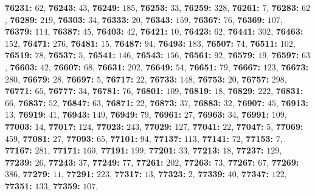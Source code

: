 \textsf{\bfseries 76231:} $62$, \textsf{\bfseries 76243:} $43$, \textsf{\bfseries 76249:} $185$, \textsf{\bfseries 76253:} $33$, \textsf{\bfseries 76259:} $328$, \textsf{\bfseries 76261:} $7$, \textsf{\bfseries 76283:} $62$, \textsf{\bfseries 76289:} $219$, \textsf{\bfseries 76303:} $34$, \textsf{\bfseries 76333:} $20$, \textsf{\bfseries 76343:} $159$, \textsf{\bfseries 76367:} $76$, \textsf{\bfseries 76369:} $107$, \textsf{\bfseries 76379:} $114$, \textsf{\bfseries 76387:} $45$, \textsf{\bfseries 76403:} $42$, \textsf{\bfseries 76421:} $10$, \textsf{\bfseries 76423:} $62$, \textsf{\bfseries 76441:} $302$, \textsf{\bfseries 76463:} $152$, \textsf{\bfseries 76471:} $276$, \textsf{\bfseries 76481:} $15$, \textsf{\bfseries 76487:} $94$, \textsf{\bfseries 76493:} $183$, \textsf{\bfseries 76507:} $74$, \textsf{\bfseries 76511:} $102$, \textsf{\bfseries 76519:} $78$, \textsf{\bfseries 76537:} $5$, \textsf{\bfseries 76541:} $146$, \textsf{\bfseries 76543:} $156$, \textsf{\bfseries 76561:} $92$, \textsf{\bfseries 76579:} $19$, \textsf{\bfseries 76597:} $63$, \textsf{\bfseries 76603:} $42$, \textsf{\bfseries 76607:} $68$, \textsf{\bfseries 76631:} $202$, \textsf{\bfseries 76649:} $54$, \textsf{\bfseries 76651:} $79$, \textsf{\bfseries 76667:} $123$, \textsf{\bfseries 76673:} $280$, \textsf{\bfseries 76679:} $28$, \textsf{\bfseries 76697:} $5$, \textsf{\bfseries 76717:} $22$, \textsf{\bfseries 76733:} $148$, \textsf{\bfseries 76753:} $20$, \textsf{\bfseries 76757:} $298$, \textsf{\bfseries 76771:} $65$, \textsf{\bfseries 76777:} $34$, \textsf{\bfseries 76781:} $76$, \textsf{\bfseries 76801:} $109$, \textsf{\bfseries 76819:} $18$, \textsf{\bfseries 76829:} $222$, \textsf{\bfseries 76831:} $66$, \textsf{\bfseries 76837:} $52$, \textsf{\bfseries 76847:} $63$, \textsf{\bfseries 76871:} $22$, \textsf{\bfseries 76873:} $37$, \textsf{\bfseries 76883:} $32$, \textsf{\bfseries 76907:} $45$, \textsf{\bfseries 76913:} $13$, \textsf{\bfseries 76919:} $41$, \textsf{\bfseries 76943:} $149$, \textsf{\bfseries 76949:} $79$, \textsf{\bfseries 76961:} $27$, \textsf{\bfseries 76963:} $34$, \textsf{\bfseries 76991:} $109$, \textsf{\bfseries 77003:} $14$, \textsf{\bfseries 77017:} $124$, \textsf{\bfseries 77023:} $243$, \textsf{\bfseries 77029:} $127$, \textsf{\bfseries 77041:} $22$, \textsf{\bfseries 77047:} $5$, \textsf{\bfseries 77069:} $459$, \textsf{\bfseries 77081:} $27$, \textsf{\bfseries 77093:} $65$, \textsf{\bfseries 77101:} $94$, \textsf{\bfseries 77137:} $113$, \textsf{\bfseries 77141:} $72$, \textsf{\bfseries 77153:} $7$, \textsf{\bfseries 77167:} $281$, \textsf{\bfseries 77171:} $160$, \textsf{\bfseries 77191:} $199$, \textsf{\bfseries 77201:} $33$, \textsf{\bfseries 77213:} $18$, \textsf{\bfseries 77237:} $129$, \textsf{\bfseries 77239:} $26$, \textsf{\bfseries 77243:} $37$, \textsf{\bfseries 77249:} $77$, \textsf{\bfseries 77261:} $202$, \textsf{\bfseries 77263:} $73$, \textsf{\bfseries 77267:} $67$, \textsf{\bfseries 77269:} $386$, \textsf{\bfseries 77279:} $11$, \textsf{\bfseries 77291:} $223$, \textsf{\bfseries 77317:} $13$, \textsf{\bfseries 77323:} $2$, \textsf{\bfseries 77339:} $40$, \textsf{\bfseries 77347:} $122$, \textsf{\bfseries 77351:} $133$, \textsf{\bfseries 77359:} $107$, 
